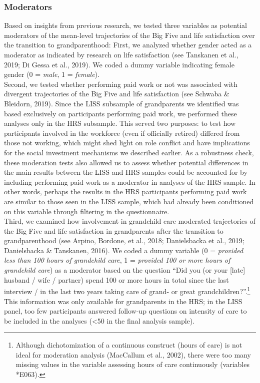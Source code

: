 \documentclass[
  english,
  man, noextraspace]{apa7}
\begin{document}
\hypertarget{moderators}{%
\subsubsection{Moderators}\label{moderators}}

Based on insights from previous research, we tested three variables as potential moderators of the mean-level trajectories of the Big Five and life satisfaction over the transition to grandparenthood: First, we analyzed whether gender acted as a moderator as indicated by research on life satisfaction (see Tanskanen et al., 2019; Di Gessa et al., 2019). We coded a dummy variable indicating female gender (0 = \emph{male}, 1 = \emph{female}).\\
Second, we tested whether performing paid work or not was associated with divergent trajectories of the Big Five and life satisfaction (see Schwaba \& Bleidorn, 2019). Since the LISS subsample of grandparents we identified was based exclusively on participants performing paid work, we performed these analyses only in the HRS subsample. This served two purposes: to test how participants involved in the workforce (even if officially retired) differed from those not working, which might shed light on role conflict and have implications for the social investment mechanisms we described earlier. As a robustness check, these moderation tests also allowed us to assess whether potential differences in the main results between the LISS and HRS samples could be accounted for by including performing paid work as a moderator in analyses of the HRS sample. In other words, perhaps the results in the HRS participants performing paid work are similar to those seen in the LISS sample, which had already been conditioned on this variable through filtering in the questionnaire.\\
Third, we examined how involvement in grandchild care moderated trajectories of the Big Five and life satisfaction in grandparents after the transition to grandparenthood (see Arpino, Bordone, et al., 2018; Danielsbacka et al., 2019; Danielsbacka \& Tanskanen, 2016). We coded a dummy variable (0 = \emph{provided less than 100 hours of grandchild care}, 1 = \emph{provided 100 or more hours of grandchild care}) as a moderator based on the question \enquote{Did you (or your {[}late{]} husband / wife / partner) spend 100 or more hours in total since the last interview / in the last two years taking care of grand- or great grandchildren?}.\footnote{Although dichotomization of a continuous construct (hours of care) is not ideal for moderation analysis (MacCallum et al., 2002), there were too many missing values in the variable assessing hours of care continuously (variables *E063).} This information was only available for grandparents in the HRS; in the LISS panel, too few participants answered follow-up questions on intensity of care to be included in the analyses (\textless50 in the final analysis sample).
\end{document}
